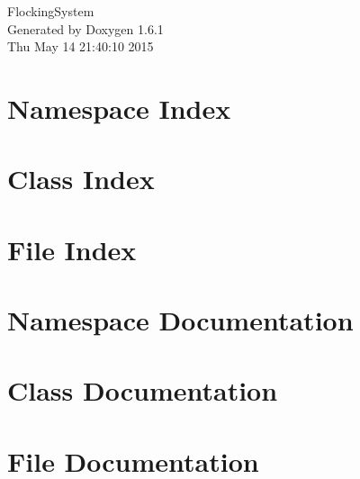 \documentclass[a4paper]{book}
\begin{document}
\hypersetup{pageanchor=false}
\begin{titlepage}
\vspace*{7cm}
\begin{center}
{\Large FlockingSystem }\\
\vspace*{1cm}
{\large Generated by Doxygen 1.6.1}\\
\vspace*{0.5cm}
{\small Thu May 14 21:40:10 2015}\\
\end{center}
\end{titlepage}
\clearemptydoublepage
{}
\tableofcontents
\clearemptydoublepage
{}
\hypersetup{pageanchor=true}
\chapter{Namespace Index}

\chapter{Class Index}

\chapter{File Index}

\chapter{Namespace Documentation}

\chapter{Class Documentation}








\chapter{File Documentation}








\printindex
\end{document}
